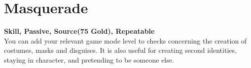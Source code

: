 \section{Masquerade}\label{sec:masquerade}
\textbf{Skill, Passive, Source(75 Gold), Repeatable}\\
You can add your relevant game mode level to checks concerning the creation of costumes, masks and disguises.
It is also useful for creating second identities, staying in character, and pretending to be someone else.